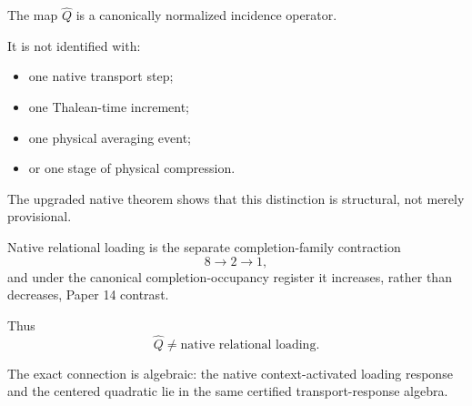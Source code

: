 The map \(\widehat Q\) is a canonically normalized incidence operator.

It is not identified with:
\begin{itemize}
\item one native transport step;
\item one Thalean-time increment;
\item one physical averaging event;
\item or one stage of physical compression.
\end{itemize}

The upgraded native theorem shows that this distinction is structural,
not merely provisional.

Native relational loading is the separate completion-family
contraction
\[
8\longrightarrow2\longrightarrow1,
\]
and under the canonical completion-occupancy register it increases,
rather than decreases, Paper 14 contrast.

Thus
\[
\widehat Q
\neq
\text{native relational loading}.
\]

The exact connection is algebraic: the native context-activated
loading response and the centered quadratic lie in the same certified
transport-response algebra.
